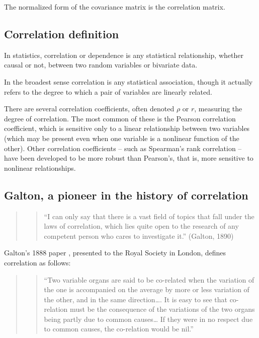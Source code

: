 \documentclass[
]{report}
\begin{document}
The normalized form of the covariance matrix is the correlation matrix.

\hypertarget{correlation-definition}{%
\subsection{Correlation definition}\label{correlation-definition}}

In statistics, correlation or dependence is any statistical relationship, whether causal or not, between two random variables or bivariate data.

In the broadest sense correlation is any statistical association, though it actually refers to the degree to which a pair of variables are linearly related.

There are several correlation coefficients, often denoted \(\rho\) or \(r\), measuring the degree of correlation. The most common of these is the Pearson correlation coefficient, which is sensitive only to a linear relationship between two variables (which may be present even when one variable is a nonlinear function of the other). Other correlation coefficients -- such as Spearman's rank correlation -- have been developed to be more robust than Pearson's, that is, more sensitive to nonlinear relationships.

\hypertarget{galton-a-pioneer-in-the-history-of-correlation}{%
\subsection{Galton, a pioneer in the history of correlation}\label{galton-a-pioneer-in-the-history-of-correlation}}

\begin{quote}
\begin{quote}
``I can only say that there is a vast field of topics that fall under the laws of correlation, which lies quite open to the research of any competent person who cares to investigate it.'' (Galton, 1890)
\end{quote}
\end{quote}

Galton's 1888 paper \citep{galton}, presented to the Royal Society in London, defines correlation as follows:

\begin{quote}
\begin{quote}
``Two variable organs are said to be co-related when the variation of the one is accompanied on the average by more or less variation of the other, and in the same direction\ldots. It is easy to see that co-relation must be the consequence of the variations of the two organs being partly due to common causes\ldots{} If they were in no respect due to common causes, the co-relation would be nil.''
\end{quote}
\end{quote}
\end{document}
